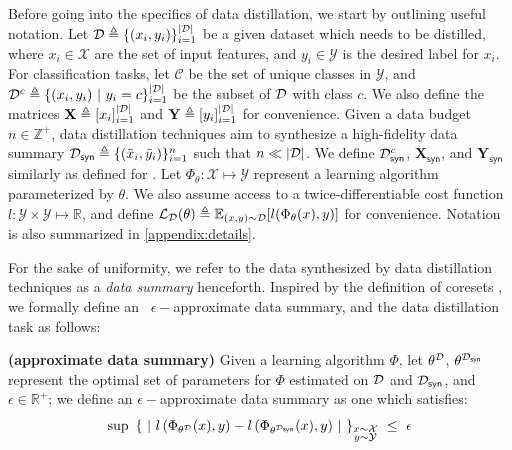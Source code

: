 \documentclass[10pt]{article} %
\begin{document}
Before going into the specifics of data distillation, we start by outlining useful notation. Let $\mathcal{D} \triangleq \{ (x_i, y_i) \}_{i=1}^{|\mathcal{D}|}$ be a given dataset which needs to be distilled, where $x_i \in \mathcal{X}$ are the set of input features, and $y_i \in \mathcal{Y}$ is the desired label for $x_i$. For classification tasks, let $\mathcal{C}$ be the set of unique classes in $\mathcal{Y}$, and $\mathcal{D}^c \triangleq \{ (x_i, y_i) ~|~ y_i = c\}_{i=1}^{|\mathcal{D}|}$ be the subset of $\mathcal{D}$ with class $c$. We also define the matrices $\mathbf{X} \triangleq [x_i]_{i=1}^{|\mathcal{D}|}$ and $\mathbf{Y} \triangleq [y_i]_{i=1}^{|\mathcal{D}|}$ for convenience. Given a data budget $n \in \mathbb{Z}^+$, data distillation techniques aim to synthesize a high-fidelity data summary $\mathcal{D}_{\mathsf{syn}} \triangleq \{ (\Tilde{x}_i, \Tilde{y}_i) \}_{i=1}^{n}$ such that $n \ll |\mathcal{D}|$. We define $\mathcal{D}_{\mathsf{syn}}^c$, $\mathbf{X}_{\mathsf{syn}}$, and $\mathbf{Y}_{\mathsf{syn}}$ similarly as defined for \dataset. Let $\Phi_{\theta} : \mathcal{X} \mapsto \mathcal{Y}$ represent a learning algorithm parameterized by $\theta$. We also assume access to a twice-differentiable cost function $l : \mathcal{Y} \times \mathcal{Y} \mapsto \mathbb{R}$, and define $\mathcal{L}_{\mathcal{D}}(\theta) \triangleq \mathbb{E}_{(x, y) \sim \mathcal{D}}[l(\Phi_{\theta}(x), y)]$ for convenience. Notation is also summarized in \cref{appendix:details}.

For the sake of uniformity, we refer to the data synthesized by data distillation techniques as a \emph{data summary} henceforth. Inspired by the definition of coresets \citep{coreset_general}, we formally define an \ $\epsilon-$approximate data summary, and the data distillation task as follows:
\begin{mydefinition} \label{def:data_quality}
    {\normalfont \textbf{(\boldmath{$\epsilon-$}approximate data summary)}} Given a learning algorithm $\Phi$, let $\theta^{\mathcal{D}}$, $\theta^{\mathcal{D}_{\mathsf{syn}}}$ represent the optimal set of parameters for $\Phi$ estimated on $\mathcal{D}$ and $\mathcal{D}_{\mathsf{syn}}$, and $\epsilon \in \mathbb{R}^+$; we define an $\epsilon-$approximate data summary as one which satisfies:
    \begin{equation} \label{eqn:eps_approx_summary}
        \operatorname{sup} ~ \left\{ ~ \left\vert \ l\left(\Phi_{\theta^{\dataset}}(x), y\right) - l\left(\Phi_{\theta^{\distill}}(x), y\right) \ \right\vert ~ \right\}_{\raisebox{6pt}{$\substack{x \sim \mathcal{X}\\y \sim \mathcal{Y}}$}} ~ \leq ~ \epsilon
    \end{equation}
\end{mydefinition}
\end{document}
